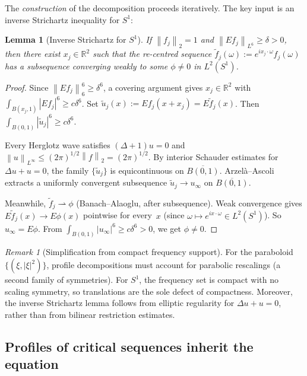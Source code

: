 \documentclass[12pt]{article}
\newtheorem{lemma}[theorem]{Lemma}
\theoremstyle{definition}
\theoremstyle{remark}
\newtheorem{remark}[theorem]{Remark}
\newcommand{\R}{\mathbb{R}}
\newcommand{\norm}[1]{\left\|#1\right\|}
\begin{document}
The \emph{construction} of the decomposition proceeds iteratively.
The key input is an inverse Strichartz inequality for $S^1$:

\begin{lemma}[Inverse Strichartz for $S^1$]
  \label{lem:inv-strichartz}
  If $\norm{f_j}_2=1$ and $\norm{Ef_j}_{L^6}\geq\delta>0$, then
  there exist $x_j\in\R^2$ such that the re-centred sequence
  $\tilde f_j(\omega):=e^{ix_j\cdot\omega}f_j(\omega)$ has a
  subsequence converging weakly to some $\phi\neq 0$ in $L^2(S^1)$.
\end{lemma}

\begin{proof}
  Since $\norm{Ef_j}_6^6\geq\delta^6$, a covering argument gives
  $x_j\in\R^2$ with $\int_{B(x_j,1)}|Ef_j|^6\geq c\delta^6$.
  Set $\tilde u_j(x):=Ef_j(x+x_j)=E\tilde f_j(x)$.  Then
  $\int_{B(0,1)}|\tilde u_j|^6\geq c\delta^6$.

  Every Herglotz wave satisfies $(\Delta+1)u=0$ and
  $\norm{u}_{L^\infty}\leq(2\pi)^{1/2}\norm{f}_2=(2\pi)^{1/2}$.
  By interior Schauder estimates for $\Delta u+u=0$, the family
  $\{\tilde u_j\}$ is equicontinuous on $\overline{B(0,1)}$.
  Arzel\`a--Ascoli extracts a uniformly convergent subsequence
  $\tilde u_j\to u_\infty$ on $\overline{B(0,1)}$.

  Meanwhile, $\tilde f_j\rightharpoonup\phi$ (Banach--Alaoglu,
  after subsequence).  Weak convergence gives
  $E\tilde f_j(x)\to E\phi(x)$ pointwise for every~$x$
  (since $\omega\mapsto e^{ix\cdot\omega}\in L^2(S^1)$).  So
  $u_\infty=E\phi$.  From
  $\int_{B(0,1)}|u_\infty|^6\geq c\delta^6>0$, we get
  $\phi\neq 0$.
\end{proof}

\begin{remark}[Simplification from compact frequency support]
  For the paraboloid $\{(\xi,|\xi|^2)\}$, profile decompositions must
  account for parabolic rescalings (a second family of symmetries).
  For $S^1$, the frequency set is compact with no scaling symmetry,
  so translations are the sole defect of compactness.  Moreover, the
  inverse Strichartz lemma follows from elliptic regularity for
  $\Delta u+u=0$, rather than from bilinear restriction estimates.
\end{remark}

\subsection{Profiles of critical sequences inherit the equation}
\end{document}
